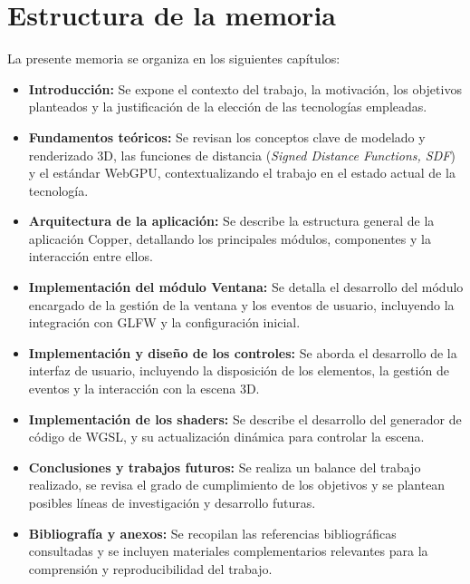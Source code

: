 \section{Estructura de la memoria}

La presente memoria se organiza en los siguientes capítulos:

\begin{itemize}
    \item \textbf{Introducción:} Se expone el contexto del trabajo, la motivación, los objetivos planteados y la justificación de la elección de las tecnologías empleadas.
    \item \textbf{Fundamentos teóricos:} Se revisan los conceptos clave de modelado y renderizado 3D, las funciones de distancia (\textit{Signed Distance Functions, SDF}) y el estándar WebGPU, contextualizando el trabajo en el estado actual de la tecnología.
    \item \textbf{Arquitectura de la aplicación:} Se describe la estructura general de la aplicación Copper, detallando los principales módulos, componentes y la interacción entre ellos.
    \item \textbf{Implementación del módulo Ventana:} Se detalla el desarrollo del módulo encargado de la gestión de la ventana y los eventos de usuario, incluyendo la integración con GLFW y la configuración inicial.
    \item \textbf{Implementación y diseño de los controles:} Se aborda el desarrollo de la interfaz de usuario, incluyendo la disposición de los elementos, la gestión de eventos y la interacción con la escena 3D.
    \item \textbf{Implementación de los shaders:} Se describe el desarrollo del generador de código de WGSL, y su actualización dinámica para controlar la escena.
    \item \textbf{Conclusiones y trabajos futuros:} Se realiza un balance del trabajo realizado, se revisa el grado de cumplimiento de los objetivos y se plantean posibles líneas de investigación y desarrollo futuras.
    \item \textbf{Bibliografía y anexos:} Se recopilan las referencias bibliográficas consultadas y se incluyen materiales complementarios relevantes para la comprensión y reproducibilidad del trabajo.
\end{itemize}